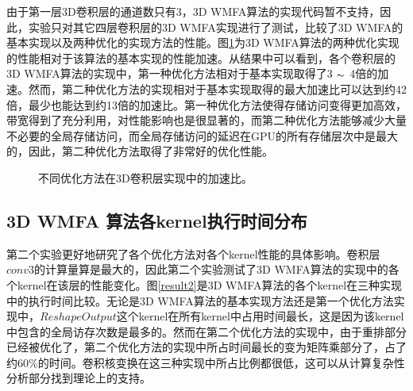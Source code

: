 由于第一层3D卷积层的通道数只有3，3D WMFA算法的实现代码暂不支持，因此，实验只对其它四层卷积层的3D WMFA实现进行了测试，比较了3D WMFA的基本实现以及两种优化的实现方法的性能。图\ref{result1}为3D WMFA算法的两种优化实现的性能相对于该算法的基本实现的性能加速。从结果中可以看到，各个卷积层的3D WMFA算法的实现中，第一种优化方法相对于基本实现取得了3 $\thicksim$ 4倍的加速。然而，第二种优化方法的实现相对于基本实现取得的最大加速比可以达到约42倍，最少也能达到约13倍的加速比。第一种优化方法使得存储访问变得更加高效，带宽得到了充分利用，对性能影响也是很显著的，而第二种优化方法能够减少大量不必要的全局存储访问，而全局存储访问的延迟在GPU的所有存储层次中是最大的，因此，第二种优化方法取得了非常好的优化性能。

\begin{figure}[tbh]%
\centering
{}
\caption{不同优化方法在3D卷积层实现中的加速比。}
\label{result1}
\end{figure}

\subsection{3D WMFA 算法各kernel执行时间分布}
第二个实验更好地研究了各个优化方法对各个kernel性能的具体影响。卷积层$conv3$的计算量算是最大的，因此第二个实验测试了3D WMFA算法的实现中的各个kernel在该层的性能变化。图\ref{result2}是3D WMFA算法的各个kernel在三种实现中的执行时间比较。无论是3D WMFA算法的基本实现方法还是第一个优化方法实现中，$ReshapeOutput$这个kernel在所有kernel中占用时间最长，这是因为该kernel中包含的全局访存次数是最多的。然而在第二个优化方法的实现中，由于重排部分已经被优化了，第二个优化方法的实现中所占时间最长的变为矩阵乘部分了，占了约$60\%$的时间。卷积核变换在这三种实现中所占比例都很低，这可以从计算复杂性分析部分找到理论上的支持。

